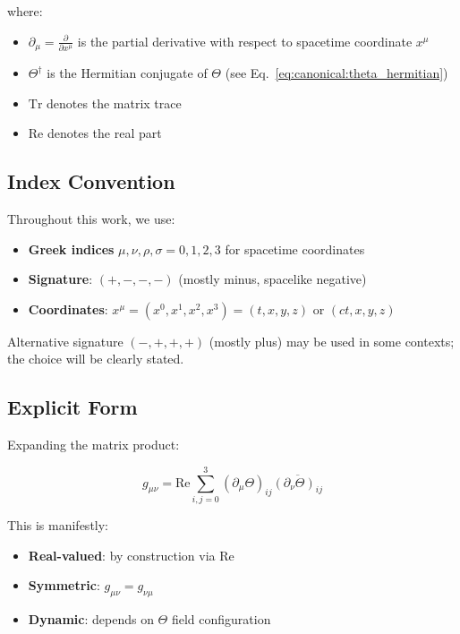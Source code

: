\noindent where:
\begin{itemize}
    \item $\partial_\mu = \frac{\partial}{\partial x^\mu}$ is the partial derivative with respect to spacetime coordinate $x^\mu$
    \item $\Theta^\dagger$ is the Hermitian conjugate of $\Theta$ (see Eq.~\ref{eq:canonical:theta_hermitian})
    \item $\text{Tr}$ denotes the matrix trace
    \item $\text{Re}$ denotes the real part
\end{itemize}

\subsection{Index Convention}

Throughout this work, we use:

\begin{itemize}
    \item \textbf{Greek indices} $\mu, \nu, \rho, \sigma = 0, 1, 2, 3$ for spacetime coordinates
    \item \textbf{Signature}: $(+, -, -, -)$ (mostly minus, spacelike negative)
    \item \textbf{Coordinates}: $x^\mu = (x^0, x^1, x^2, x^3) = (t, x, y, z)$ or $(ct, x, y, z)$
\end{itemize}

Alternative signature $(-, +, +, +)$ (mostly plus) may be used in some contexts; the choice will be clearly stated.

\subsection{Explicit Form}

Expanding the matrix product:

\begin{equation}
\label{eq:canonical:metric_explicit}
g_{\mu\nu} = \text{Re}\sum_{i,j=0}^{3} (\partial_\mu\Theta)_{ij} \overline{(\partial_\nu\Theta)_{ij}}
\end{equation}

This is manifestly:
\begin{itemize}
    \item \textbf{Real-valued}: by construction via $\text{Re}$
    \item \textbf{Symmetric}: $g_{\mu\nu} = g_{\nu\mu}$
    \item \textbf{Dynamic}: depends on $\Theta$ field configuration
\end{itemize}

